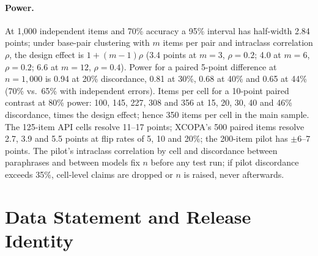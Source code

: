 \paragraph{Power.}
At 1,000 independent items and 70\% accuracy a 95\% interval has half-width 2.84 points; under base-pair clustering with $m$ items per pair and intraclass correlation $\rho$, the design effect is $1 + (m-1)\rho$ (3.4 points at $m = 3$, $\rho = 0.2$; 4.0 at $m = 6$, $\rho = 0.2$; 6.6 at $m = 12$, $\rho = 0.4$). Power for a paired 5-point difference at $n = 1{,}000$ is 0.94 at 20\% discordance, 0.81 at 30\%, 0.68 at 40\% and 0.65 at 44\% (70\% vs.\ 65\% with independent errors). Items per cell for a 10-point paired contrast at 80\% power: 100, 145, 227, 308 and 356 at 15, 20, 30, 40 and 46\% discordance, times the design effect; hence 350 items per cell in the main sample. The 125-item API cells resolve 11--17 points; XCOPA's 500 paired items resolve 2.7, 3.9 and 5.5 points at flip rates of 5, 10 and 20\%; the 200-item pilot has $\pm$6--7 points. The pilot's intraclass correlation by cell and discordance between paraphrases and between models fix $n$ before any test run; if pilot discordance exceeds 35\%, cell-level claims are dropped or $n$ is raised, never afterwards.

\section{Data Statement and Release Identity}
\label{app:datastatement}

